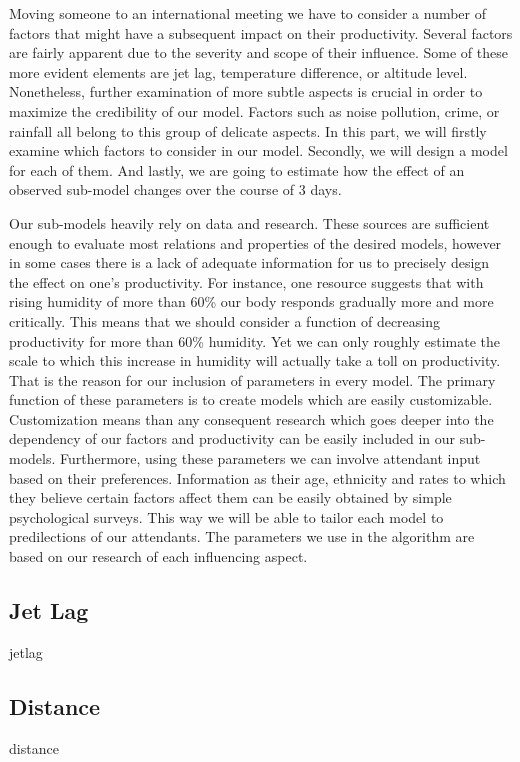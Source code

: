 
Moving someone to an international meeting we have to consider a number of factors that might have a subsequent impact on their productivity. Several factors are fairly apparent due to the severity and scope of their influence. Some of these more evident elements are jet lag, temperature difference, or altitude level. Nonetheless, further examination of more subtle aspects is crucial in order to maximize the credibility of our model. Factors such as noise pollution, crime, or rainfall all belong to this group of delicate aspects. In this part, we will firstly examine which factors to consider in our model. Secondly, we will design a model for each of them. And lastly, we are going to estimate how the effect of an observed sub-model changes over the course of 3 days.

Our sub-models heavily rely on data and research. These sources are sufficient enough to evaluate most relations and properties of the desired models, however in some cases there is a lack of adequate information for us to precisely design the effect on one's productivity. For instance, one resource \cite{wiki-humidity_effect} suggests that with rising humidity of more than 60\% our body responds gradually more and more critically. This means that we should consider a function of decreasing productivity for more than 60\% humidity. Yet we can only roughly estimate the scale to which this increase in humidity will actually take a toll on productivity. That is the reason for our inclusion of parameters in every model. The primary function of these parameters is to create models which are easily customizable. Customization means than any consequent research which goes deeper into the dependency of our factors and productivity can be easily included in our sub-models. Furthermore, using these parameters we can involve attendant input based on their preferences. Information as their age, ethnicity and rates to which they believe certain factors affect them can be easily obtained by simple psychological surveys. This way we will be able to tailor each model to predilections of our attendants. The parameters we use in the algorithm are based on our research of each influencing aspect.

\subsection{Jet Lag}
{jetlag}

\subsection{Distance}
{distance}

